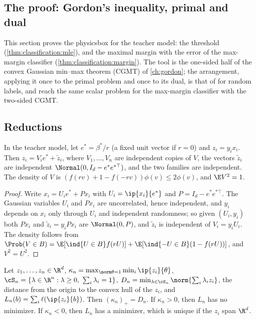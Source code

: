 \begin{refsection}
\section{The proof: Gordon's inequality, primal and dual}\label{sec:classification:proof}

This section proves the physicsbox for the teacher model: the threshold (\cref{thm:classification:mle}), and the maximal margin with the error of the max-margin classifier (\cref{thm:classification:margin}). The tool is the one-sided half of the convex Gaussian min--max theorem (CGMT) of \cref{ch:gordon}; the arrangement, applying it once to the primal problem and once to its dual, is that of \textcite{Stojnic2013a} for random labels, and \textcite{MontanariEtAl2025} reach the same scalar problem for the max-margin classifier with the two-sided CGMT.

\subsection{Reductions}

\begin{lemma}\label{lem:classification:rotation}
In the teacher model, let $e^*=\beta^*/r$ (a fixed unit vector if $r=0$) and $z_i=y_ix_i$. Then $z_i=V_ie^*+\tilde z_i$, where $V_1,\dots,V_n$ are independent copies of $V$, the vectors $\tilde z_i$ are independent $\Normal(0,I_d-e^*e^{*\top})$, and the two families are independent. The density of $V$ is $(f(rv)+1-f(-rv))\phi(v)\le2\phi(v)$, and $\E V^2=1$.
\end{lemma}

\begin{proof}
Write $x_i=U_ie^*+Px_i$ with $U_i=\ip{x_i}{e^*}$ and $P=I_d-e^*e^{*\top}$. The Gaussian variables $U_i$ and $Px_i$ are uncorrelated, hence independent, and $y_i$ depends on $x_i$ only through $U_i$ and independent randomness; so given $(U_i,y_i)$ both $Px_i$ and $\tilde z_i=y_iPx_i$ are $\Normal(0,P)$, and $\tilde z_i$ is independent of $V_i=y_iU_i$. The density follows from $\Prob(V\in B)=\E[\ind\{U\in B\}f(rU)]+\E[\ind\{-U\in B\}(1-f(rU))]$, and $V^2=U^2$.
\end{proof}

\begin{lemma}\label{lem:classification:deterministic}
Let $z_1,\dots,z_n\in\R^d$, $\kappa_n=\max_{\norm\theta=1}\min_i\ip{z_i}{\theta}$, $\cS_n=\{\lambda\in\R^n:\lambda\ge0,\ \sum_i\lambda_i=1\}$, $D_n=\min_{\lambda\in\cS_n}\norm{\sum_i\lambda_iz_i}$, the distance from the origin to the convex hull of the $z_i$, and $L_n(b)=\sum_i\ell(\ip{z_i}{b})$. Then $(\kappa_n)_+=D_n$. If $\kappa_n>0$, then $L_n$ has no minimizer. If $\kappa_n<0$, then $L_n$ has a minimizer, which is unique if the $z_i$ span $\R^d$.
\end{lemma}


\end{refsection}

